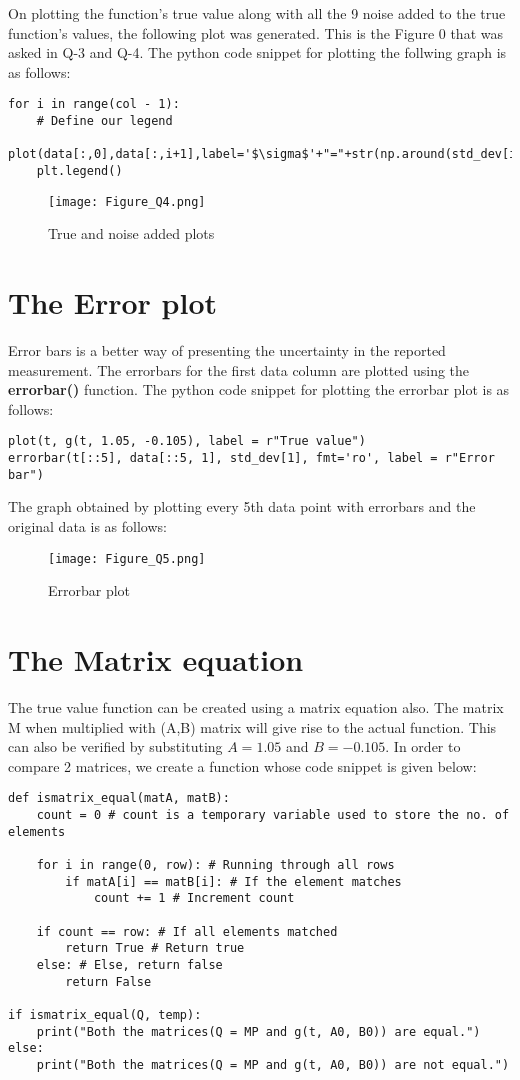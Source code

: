 \documentclass[11pt, a4paper]{article}
\begin{document}
On plotting the function's true value along with all the 9 noise added to the true function's values, the following plot was generated. This is the Figure 0 that was asked in Q-3 and Q-4. The python code snippet for plotting the follwing graph is as follows:

\begin{verbatim}	
for i in range(col - 1):
    # Define our legend
    plot(data[:,0],data[:,i+1],label='$\sigma$'+"="+str(np.around(std_dev[i],3))) 
    plt.legend()
\end{verbatim}

	\begin{figure}[!tbh]
   	\centering
   	\texttt{[image: Figure\_Q4.png]}   
   	\caption{True and noise added plots}
   	\label{fig:sample}
   \end{figure} 
   
\section{The Error plot}
Error bars is a better way of presenting the uncertainty in the reported measurement. The errorbars for the first data column are plotted using the \textbf{errorbar()} function. The python code snippet for plotting the errorbar plot is as follows:
\begin{verbatim}	
plot(t, g(t, 1.05, -0.105), label = r"True value")
errorbar(t[::5], data[::5, 1], std_dev[1], fmt='ro', label = r"Error bar") 
\end{verbatim}
 The graph obtained by plotting every 5th data point with errorbars and the original data is as follows:   
	\begin{figure}[!tbh]
   	\centering
   	\texttt{[image: Figure\_Q5.png]}   
   	\caption{Errorbar plot}
   	\label{fig:sample}
   \end{figure} 
  
\section{The Matrix equation}
The true value function can be created using a matrix equation also. The matrix M when multiplied with (A,B) matrix will give rise to the actual function. This can also be verified by substituting $A=1.05$ and $B=-0.105$. In order to compare 2 matrices, we create a function  whose code snippet is given below:
  \begin{verbatim}	
def ismatrix_equal(matA, matB):
    count = 0 # count is a temporary variable used to store the no. of elements
    
    for i in range(0, row): # Running through all rows
        if matA[i] == matB[i]: # If the element matches                       
            count += 1 # Increment count

    if count == row: # If all elements matched
        return True # Return true
    else: # Else, return false
        return False

if ismatrix_equal(Q, temp):
    print("Both the matrices(Q = MP and g(t, A0, B0)) are equal.")
else: 
    print("Both the matrices(Q = MP and g(t, A0, B0)) are not equal.")           
\end{verbatim} 
\end{document}
